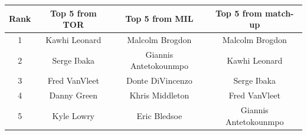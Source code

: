 \documentclass[12pt]{article}%
\begin{document}
\begin{center}
\begin{tabular}{|c|c c c|}
\hline
\textbf{Rank} &\textbf{Top 5 from TOR} &\textbf{Top 5 from MIL}&\textbf{Top 5 from match-up}\\\hline
1&Kawhi Leonard&Malcolm Brogdon&Malcolm Brogdon\\\hline
2&Serge Ibaka&Giannis Antetokounmpo&Kawhi Leonard\\\hline
3&Fred VanVleet&Donte DiVincenzo&Serge Ibaka\\\hline
4&Danny Green&Khris Middleton&Fred VanVleet\\\hline
5&Kyle Lowry&Eric Bledsoe&Giannis Antetokounmpo\\\hline
\end{tabular}
\end{center}
\end{document}
